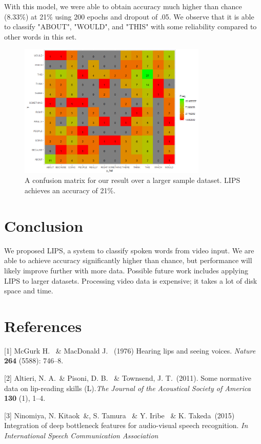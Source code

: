 \documentclass{article}
\begin{document}
With this model, we were able to obtain accuracy much higher than chance (8.33\%) at 21\% using 200 epochs and dropout of .05. We observe that it is able to classify "ABOUT", "WOULD", and "THIS" with some reliability compared to other words in this set.

   \begin{figure}[h!]
 \centering
  \includegraphics[width=0.8\textwidth]{result2}
 \caption{A confusion matrix for our result over a larger sample dataset. LIPS achieves an accuracy of 21\%.}
 \end{figure}

\section{Conclusion}

We proposed LIPS, a system to classify spoken words from video input. We are able to achieve accuracy significantly higher than chance, but performance will likely improve further with more data. Possible future work includes applying LIPS to larger datasets. Processing video data is expensive; it takes a lot of disk space and time. 

\section*{References}
\small

[1] McGurk H. \ \& MacDonald J. \ (1976) Hearing lips and seeing voices. {\it Nature} {\bf 264} (5588): 746–8.

[2] Altieri, N. A.\ \& Pisoni, D. B. \ \& Townsend, J. T.\  (2011). Some normative data on lip-reading skills (L).{\it The Journal of the Acoustical Society of America}  {\bf 130} (1), 1–4.

[3]  Ninomiya, N. Kitaok\ \&, S. Tamura \ \& Y. Iribe \ \&  K. Takeda\ (2015) Integration of deep bottleneck features for audio-visual speech recognition. {\it In International Speech Communication Association}
\end{document}
